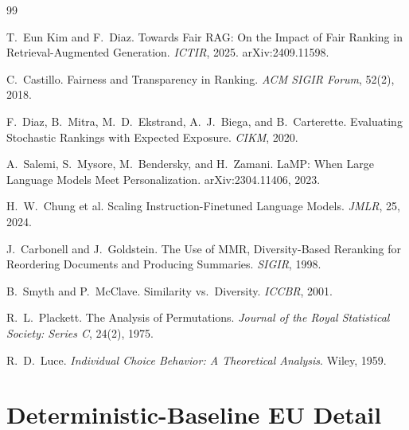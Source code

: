 \documentclass[10pt,twocolumn]{article}
\begin{document}
{\small
\begin{thebibliography}{99}

T.\ Eun Kim and F.\ Diaz.
\newblock Towards Fair RAG: On the Impact of Fair Ranking in Retrieval-Augmented
Generation.
\newblock \emph{ICTIR}, 2025. arXiv:2409.11598.

C.\ Castillo.
\newblock Fairness and Transparency in Ranking.
\newblock \emph{ACM SIGIR Forum}, 52(2), 2018.

F.\ Diaz, B.\ Mitra, M.\ D.\ Ekstrand, A.\ J.\ Biega, and B.\ Carterette.
\newblock Evaluating Stochastic Rankings with Expected Exposure.
\newblock \emph{CIKM}, 2020.

A.\ Salemi, S.\ Mysore, M.\ Bendersky, and H.\ Zamani.
\newblock LaMP: When Large Language Models Meet Personalization.
\newblock arXiv:2304.11406, 2023.

H.\ W.\ Chung et al.
\newblock Scaling Instruction-Finetuned Language Models.
\newblock \emph{JMLR}, 25, 2024.

J.\ Carbonell and J.\ Goldstein.
\newblock The Use of MMR, Diversity-Based Reranking for Reordering Documents and
Producing Summaries.
\newblock \emph{SIGIR}, 1998.

B.\ Smyth and P.\ McClave.
\newblock Similarity vs.\ Diversity.
\newblock \emph{ICCBR}, 2001.

R.\ L.\ Plackett.
\newblock The Analysis of Permutations.
\newblock \emph{Journal of the Royal Statistical Society: Series C}, 24(2), 1975.

R.\ D.\ Luce.
\newblock \emph{Individual Choice Behavior: A Theoretical Analysis}.
\newblock Wiley, 1959.

\end{thebibliography}
}

\clearpage
\appendix
\section{Deterministic-Baseline EU Detail}
\label{app:baseline}
\end{document}

